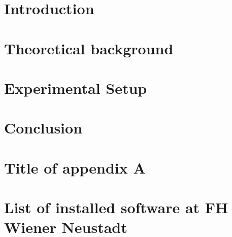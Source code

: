 \documentclass{article}
\begin{document}
\chapter{Introduction}
    \setcounter{page}{1}


\chapter{Theoretical background}


\chapter{Experimental Setup}


\chapter{Conclusion}

    
        
\printbibliography[title={References}]


\chapter{Title of appendix A}


\chapter{List of installed software at FH Wiener Neustadt}

\end{document}
